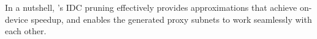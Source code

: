 
% 
In a nutshell, \sys's IDC pruning effectively provides approximations that achieve on-device speedup, and enables the generated proxy subnets to work seamlessly with each other.


